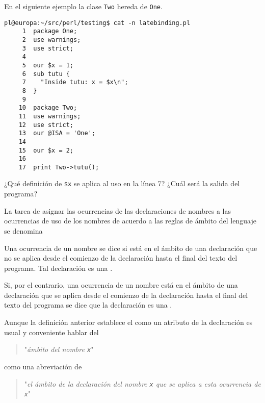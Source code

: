 \begin{exercise}
En el siguiente ejemplo la clase \verb|Two| hereda de \verb|One|.
\begin{verbatim}
pl@europa:~/src/perl/testing$ cat -n latebinding.pl
     1  package One;
     2  use warnings;
     3  use strict;
     4
     5  our $x = 1;
     6  sub tutu {
     7    "Inside tutu: x = $x\n";
     8  }
     9
    10  package Two;
    11  use warnings;
    12  use strict;
    13  our @ISA = 'One';
    14
    15  our $x = 2;
    16
    17  print Two->tutu();
\end{verbatim}
¿Qué definición de \verb|$x| se aplica al uso en la línea 7?
¿Cuál será la salida del programa?
%
\end{exercise}
\begin{definition}
La tarea de asignar las ocurrencias de las declaraciones de nombres a las 
ocurrencias de uso  de los nombres de acuerdo a las reglas de ámbito
del lenguaje se denomina 
\end{definition}

\begin{definition}
Una ocurrencia de un nombre se dice  si está en el ámbito 
de una declaración que no se aplica desde el comienzo de la declaración 
hasta el final del texto del programa. Tal declaración
es una .
\end{definition}

\begin{definition}
Si, por el contrario, una ocurrencia de un nombre está en el ámbito
de una declaración que se aplica desde el comienzo de la declaración 
hasta el final del texto del programa se dice que la declaración
es una .
\end{definition}

\begin{definition}
Aunque la definición anterior establece el 
como un atributo de la declaración es usual y conveniente
hablar del 
\begin{quote}
"\emph{ámbito del nombre {\tt x}}" 
\end{quote}
como una abreviación
de 
\begin{quote}
"\emph{el ámbito de la declaración del nombre {\tt x}
que se aplica a esta ocurrencia de {\tt x}}"
\end{quote}
\end{definition}

